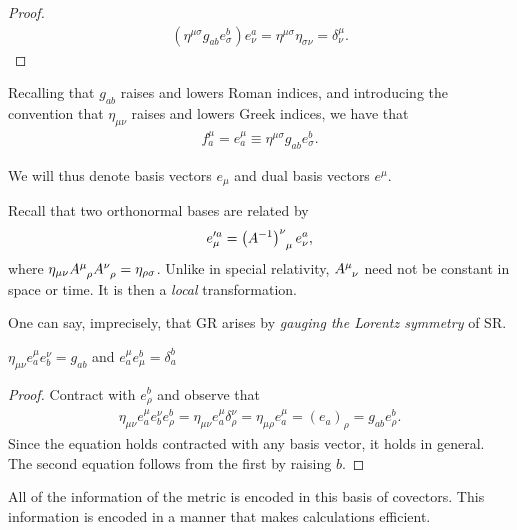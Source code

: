 \begin{proof}
    \begin{align}
        \left( \eta^{\mu \sigma} g_{ab} e^{b}_{\sigma} \right) e^{a}_\nu = \eta^{\mu \sigma} \eta_{\sigma \nu} = \delta^{\mu}_{\nu} 
    .\end{align}
\end{proof}

Recalling that $g_{ab}$ raises and lowers Roman indices, and introducing the convention that $\eta_{\mu \nu}$ raises and lowers Greek indices, we have that
\begin{align}
    f^{\mu}_a = e^{\mu}_a \equiv \eta^{\mu \sigma} g_{ab} e^{b}_\sigma
.\end{align}

We will thus denote basis vectors $e_{\mu}$ and dual basis vectors $e^{\mu}$.

Recall that two orthonormal bases are related by
\begin{align}
    e'^{a}_{\mu} = \tensor{\left( A^{-1} \right)}{^{\nu}_{\mu}} e^{a}_\nu
,\end{align}
where $\eta_{\mu \nu} \tensor{A}{^{\mu}_\rho} \tensor{A}{^{\nu}_\rho} = \eta_{\rho \sigma}$. Unlike in special relativity, $\tensor{A}{^{\mu}_\nu}$ need not be constant in space or time. It is then a \textit{local} transformation.

One can say, imprecisely, that GR arises by \textit{gauging the Lorentz symmetry} of SR.

\begin{claim}
    $\eta_{\mu \nu} e_a^{\mu} e_{b}^{\nu} = g_{ab}$ and $e_{a}^{\mu} e_{\mu}^{b} = \delta_{a}^{b}$
\end{claim}

\begin{proof}
    Contract with $e^{b}_\rho$ and observe that
    \begin{align}
        \eta_{\mu \nu} e^{\mu}_a e^{\nu}_b e^{b}_\rho = \eta_{\mu \nu} e_a^{\mu} \delta^{\nu}_\rho = \eta_{\mu \rho} e^{\mu}_a = \left( e_a \right)_{\rho} = g_{ab} e^{b}_\rho
    .\end{align}
    Since the equation holds contracted with any basis vector, it holds in general.
    The second equation follows from the first by raising $b$.
\end{proof}

All of the information of the metric is encoded in this basis of covectors. This information is encoded in a manner that makes calculations efficient.
